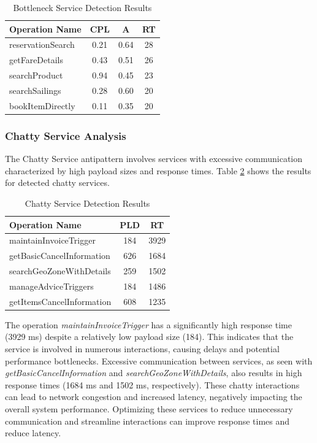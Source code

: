 \documentclass[12pt, times]{article}
\begin{document}
	\begin{table}[h]
		\centering
		\begin{tabular}{|l|c|c|c|}
			\hline
			\textbf{Operation Name} & \textbf{CPL} & \textbf{A} & \textbf{RT} \\
			\hline
			reservationSearch & 0.21 & 0.64 & 28 \\
			\hline
			getFareDetails & 0.43 & 0.51 & 26 \\
			\hline
			searchProduct & 0.94 & 0.45 & 23 \\
			\hline
			searchSailings & 0.28 & 0.60 & 20 \\
			\hline
			bookItemDirectly & 0.11 & 0.35 & 20 \\
			\hline
		\end{tabular}
		\caption{Bottleneck Service Detection Results}
		\label{tab:bottleneck_results}
	\end{table}
	
	\subsubsection{Chatty Service Analysis}
	\hspace*{5mm} The Chatty Service antipattern involves services with excessive communication characterized by high payload sizes and response times. Table \ref{tab:chatty_results} shows the results for detected chatty services.
	
	\begin{table}[h]
		\centering
		\begin{tabular}{|l|c|c|}
			\hline
			\textbf{Operation Name} & \textbf{PLD} & \textbf{RT} \\
			\hline
			maintainInvoiceTrigger & 184 & 3929 \\
			\hline
			getBasicCancelInformation & 626 & 1684 \\
			\hline
			searchGeoZoneWithDetails & 259 & 1502 \\
			\hline
			manageAdviceTriggers & 184 & 1486 \\
			\hline
			getItemsCancelInformation & 608 & 1235 \\
			\hline
		\end{tabular}
		\caption{Chatty Service Detection Results}
		\label{tab:chatty_results}
	\end{table}
	
	\hspace*{5mm} The operation \textit{maintainInvoiceTrigger} has a significantly high response time (3929 ms) despite a relatively low payload size (184). This indicates that the service is involved in numerous interactions, causing delays and potential performance bottlenecks. Excessive communication between services, as seen with \textit{getBasicCancelInformation} and \textit{searchGeoZoneWithDetails}, also results in high response times (1684 ms and 1502 ms, respectively). These chatty interactions can lead to network congestion and increased latency, negatively impacting the overall system performance. Optimizing these services to reduce unnecessary communication and streamline interactions can improve response times and reduce latency.
	
\end{document}
